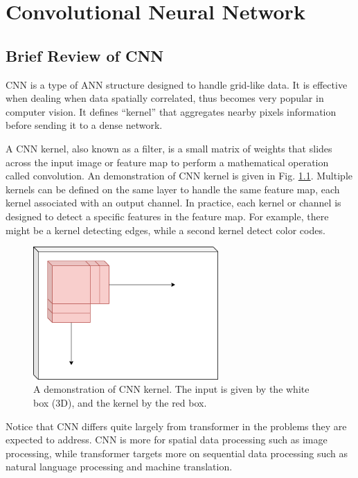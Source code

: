 \chapter{Convolutional Neural Network}

\section{Brief Review of CNN}

CNN is a type of ANN structure designed to handle grid-like data. It is effective when dealing when data spatially correlated, thus becomes very popular in computer vision. It defines ``kernel'' that aggregates nearby pixels information before sending it to a dense network.

A CNN kernel, also known as a filter, is a small matrix of weights that slides across the input image or feature map to perform a mathematical operation called convolution. An demonstration of CNN kernel is given in Fig. \ref{ch:cnn:fig:cnn_kernel}. Multiple kernels can be defined on the same layer to handle the same feature map, each kernel associated with an output channel. In practice, each kernel or channel is designed to detect a specific features in the feature map. For example, there might be a kernel detecting edges, while a second kernel detect color codes.

\begin{figure}
	\centering
	\includegraphics[width=200pt]{chapters/part-5/figures/cnn_general.png}
	\caption{A demonstration of CNN kernel. The input is given by the white box (3D), and the kernel by the red box.} \label{ch:cnn:fig:cnn_kernel}
\end{figure}

Notice that CNN differs quite largely from transformer in the problems they are expected to address. CNN is more for spatial data processing such as image processing, while transformer targets more on sequential data processing such as natural language processing and machine translation. 
